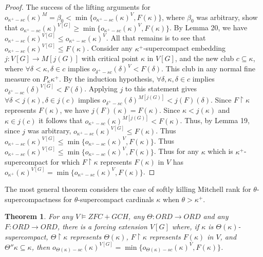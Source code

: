 \documentclass[10pt,leqno]{amsart}
\newtheorem{theorem}{Theorem}[]
\begin{document}
\begin{proof}
The success of the lifting arguments for $o_{\kappa^+-sc}(\kappa)^M = \beta_0 < \min\{o_{\kappa^+-sc}(\kappa)^V, F(\kappa)\}$, where $\beta_0$ was arbitrary, show that $o_{\kappa^+-sc}(\kappa)^{V[G]} \ge \min\{o_{\kappa^+-sc}(\kappa)^V, F(\kappa)\}$. By Lemma 20, we have $o_{\kappa^+-sc}(\kappa)^{V[G]} \le o_{\kappa^+-sc}(\kappa)^V$. All that remains is to see that $o_{\kappa^+-sc}(\kappa)^{V[G]} \le F(\kappa)$. Consider any $\kappa^+$-supercompact embedding $j:V[G] \to M[j(G)]$ with critical point $\kappa$ in $V[G]$, and the new club $c \subseteq \kappa$, where $\forall \delta < \kappa, \delta \in c$ implies $o_{\delta^+-sc}(\delta)^V < F(\delta)$. This club in any normal fine measure on $P_{\kappa}\kappa^+$. By the induction hypothesis, $\forall \delta, \kappa, \delta \in c$ implies $o_{\delta^+-sc}(\delta)^{V[G]} < F(\delta)$. Applying $j$ to this statement gives $\forall \delta < j(\kappa), \delta \in j(c)$ implies $o_{\delta^+-sc}(\delta)^{M[j(G)]} < j(F)(\delta)$. Since $F \upharpoonright \kappa$ represents $F(\kappa)$, we have $j(F)(\kappa)= F(\kappa)$. Since $\kappa < j(\kappa)$ and $\kappa \in j(c)$ it follows that $o_{\kappa^+-sc}(\kappa)^{M[j(G)]} < F(\kappa)$. Thus, by Lemma 19, since $j$ was arbitrary, $o_{\kappa^+-sc}(\kappa)^{V[G]} \le F(\kappa)$. Thus $o_{\kappa^+-sc}(\kappa)^{V[G]} \le \min\{o_{\kappa^+-sc}(\kappa)^V, F(\kappa)\}$. Thus $o_{\kappa^+-sc}(\kappa)^{V[G]} \le \min\{o_{\kappa^+-sc}(\kappa)^V, F(\kappa)\}$. Thus for any $\kappa$ which is $\kappa^+$-supercompact for which $F \upharpoonright \kappa$ represents $F(\kappa)$ in $V$ has $o_{\kappa^+}(\kappa)^{V[G]} = \min\{o_{\kappa^+-sc}(\kappa)^V, F(\kappa)\}$.
\end{proof}

The most general theorem considers the case of softly killing Mitchell rank for $\theta$-supercompactness for $\theta$-supercompact cardinals $\kappa$ when $\theta > \kappa^+$.

\begin{theorem} For any $V \models ZFC + GCH$, any $\Theta: ORD \to ORD$ and any $F: ORD \to ORD$, there is a forcing extension $V[G]$ where, if $\kappa$ is $\Theta(\kappa)$-supercompact, $\Theta \upharpoonright \kappa$ represents $\Theta(\kappa)$, $F \upharpoonright \kappa$ represents $F(\kappa)$ in $V$, and $\Theta''\kappa \subseteq \kappa$, then $o_{\Theta(\kappa)-sc}(\kappa)^{V[G]} = \min\{o_{\Theta(\kappa)-sc}(\kappa)^V, F(\kappa)\}$.
\end{theorem}
\end{document}
